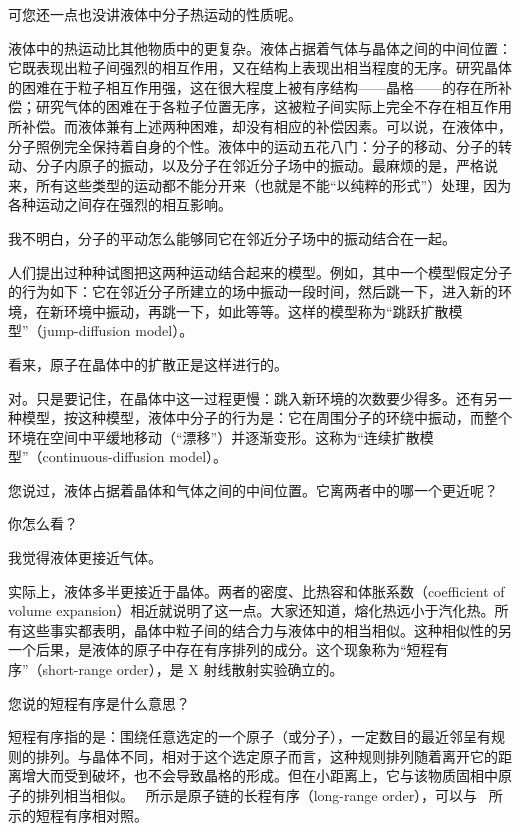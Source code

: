 \begin{dialogue}
\stdb 可您还一点也没讲液体中分子热运动的性质呢。

\tchr 液体中的热运动比其他物质中的更复杂。液体占据着气体与晶体之间的中间位置：它既表现出粒子间强烈的相互作用，又在结构上表现出相当程度的无序。研究晶体的困难在于粒子相互作用强，这在很大程度上被有序结构——晶格——的存在所补偿；研究气体的困难在于各粒子位置无序，这被粒子间实际上完全不存在相互作用所补偿。而液体兼有上述两种困难，却没有相应的补偿因素。可以说，在液体中，分子照例完全保持着自身的个性。液体中的运动五花八门：分子的移动、分子的转动、分子内原子的振动，以及分子在邻近分子场中的振动。最麻烦的是，严格说来，所有这些类型的运动都不能分开来（也就是不能“以纯粹的形式”）处理，因为各种运动之间存在强烈的相互影响。

\stdb 我不明白，分子的平动怎么能够同它在邻近分子场中的振动结合在一起。

\tchr 人们提出过种种试图把这两种运动结合起来的模型。例如，其中一个模型假定分子的行为如下：它在邻近分子所建立的场中振动一段时间，然后跳一下，进入新的环境，在新环境中振动，再跳一下，如此等等。这样的模型称为“跳跃扩散模型”（jump-diffusion model）。

\stdb 看来，原子在晶体中的扩散正是这样进行的。

\tchr 对。只是要记住，在晶体中这一过程更慢：跳入新环境的次数要少得多。还有另一种模型，按这种模型，液体中分子的行为是：它在周围分子的环绕中振动，而整个环境在空间中平缓地移动（“漂移”）并逐渐变形。这称为“连续扩散模型”（continuous-diffusion model）。

\stdb 您说过，液体占据着晶体和气体之间的中间位置。它离两者中的哪一个更近呢？

\tchr 你怎么看？

\stdb 我觉得液体更接近气体。

\tchr 实际上，液体多半更接近于晶体。两者的密度、比热容和体胀系数（coefficient of volume expansion）相近就说明了这一点。大家还知道，熔化热远小于汽化热。所有这些事实都表明，晶体中粒子间的结合力与液体中的相当相似。这种相似性的另一个后果，是液体的原子中存在有序排列的成分。这个现象称为“短程有序”（short-range order），是 X 射线散射实验确立的。

\stdb 您说的短程有序是什么意思？

\tchr 短程有序指的是：围绕任意选定的一个原子（或分子），一定数目的最近邻呈有规则的排列。与晶体不同，相对于这个选定原子而言，这种规则排列随着离开它的距离增大而受到破坏，也不会导致晶格的形成。但在小距离上，它与该物质固相中原子的排列相当相似。~ 所示是原子链的长程有序（long-range order），可以与~ 所示的短程有序相对照。


\end{dialogue}
